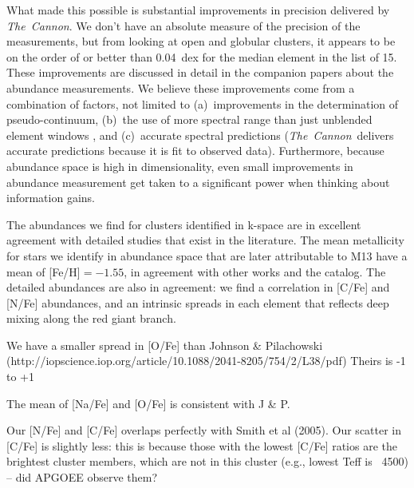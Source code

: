 \documentclass[12pt, letterpaper, preprint]{aastex}
\newcommand{\project}[1]{\textsl{#1}}
\newcommand{\thecannon}{\project{The~Cannon}}
\begin{document}
What made this possible is substantial improvements in precision
delivered by \thecannon.
We don't have an absolute measure of the precision of the measurements,
but from looking at open and globular clusters, it appears to be on the
order of or better than 0.04~dex for the median element in the list of 15.
These improvements are discussed in detail in the companion papers
\citep{casey16, ness16} about the abundance measurements.
We believe these improvements come from a combination of factors, not
limited to (a)~improvements in the determination of pseudo-continuum,
(b)~the use of more spectral range than just unblended element windows
\citep{aspcap}, and (c)~accurate spectral predictions
(\thecannon\ delivers accurate predictions because it is fit to
observed data). 
Furthermore, because abundance space is high in dimensionality, even
small improvements in abundance measurement get taken to a significant
power when thinking about information gains.


The abundances we find for clusters identified in k-space are in excellent
agreement with detailed studies that exist in the literature. The mean
metallicity for stars we identify in abundance space that are later attributable
to M13 have a mean of [Fe/H]$ = -1.55$, in agreement with other works \citep{Kraft_1992,Cohen_Melendez,Johnson_Pilachowski} and the \citet{Harris} catalog.
The detailed abundances are also in agreement: we find a correlation in 
[C/Fe] and [N/Fe] abundances, and an intrinsic spreads in each element
that reflects deep mixing along the red giant branch.



We have a smaller spread in [O/Fe] than Johnson & Pilachowski (http://iopscience.iop.org/article/10.1088/2041-8205/754/2/L38/pdf)
Theirs is -1 to +1

The mean of [Na/Fe] and [O/Fe] is consistent with J & P.



Our [N/Fe] and [C/Fe] overlaps perfectly with Smith et al (2005). Our scatter in [C/Fe] is slightly less: this is because those with the lowest [C/Fe] ratios are the brightest cluster members, which are not in this cluster (e.g., lowest Teff is ~4500) -- did APGOEE observe them?


\end{document}
